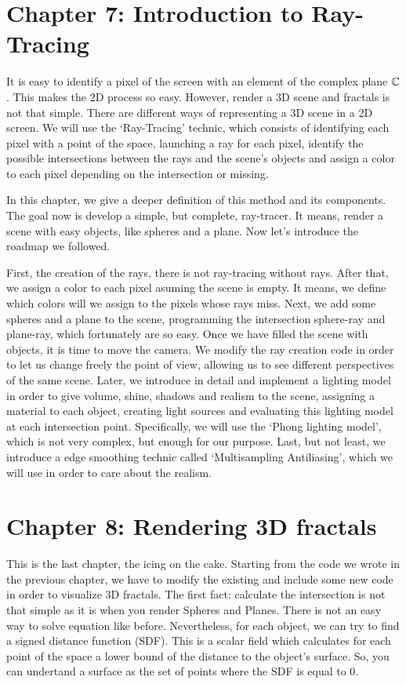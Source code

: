 \section*{Chapter 7: Introduction to Ray-Tracing}

It is easy to identify a pixel of the screen with an element of the complex plane $\mathbb{C}$. This makes the 2D process so easy. However, render a 3D scene and fractals is not that simple. There are different ways of representing a 3D scene in a 2D screen. We will use the `Ray-Tracing' technic, which consists of identifying each pixel with a point of the space, launching a ray for each pixel, identify the possible intersections between the rays and the scene's objects and assign a color to each pixel depending on the intersection or missing.

In this chapter, we give a deeper definition of this method and its components. The goal now is develop a simple, but complete, ray-tracer. It means, render a scene with easy objects, like spheres and a plane. Now let's introduce the roadmap we followed.

First, the creation of the rays, there is not ray-tracing without rays. After that, we assign a color to each pixel asuming the scene is empty. It means, we define which colors will we assign to the pixels whose rays miss. Next, we add some spheres and a plane to the scene, programming the intersection sphere-ray and plane-ray, which fortunately are so easy. Once we have filled the scene with objects, it is time to move the camera. We modify the ray creation code in order to let us change freely the point of view, allowing us to see different perspectives of the same scene. Later, we introduce in detail and implement a lighting model in order to give volume, shine, shadows and realism to the scene, assigning a material to each object, creating light sources and evaluating this lighting model at each intersection point. Specifically, we will use the `Phong lighting model', which is not very complex, but enough for our purpose. Last, but not least, we introduce a edge smoothing technic called `Multisampling Antiliasing', which we will use in order to care about the realism.

\section*{Chapter 8: Rendering 3D fractals}

This is the last chapter, the icing on the cake. Starting from the code we wrote in the previous chapter, we have to modify the existing and include some new code in order to visualize 3D fractals. The first fact: calculate the intersection is not that simple as it is when you render Spheres and Planes. There is not an easy way to solve equation like before. Nevertheless, for each object, we can try to find a signed distance function (SDF). This is a scalar field which calculates for each point of the space a lower bound of the distance to the object's surface. So, you can undertand a surface as the set of points where the SDF is equal to 0.

